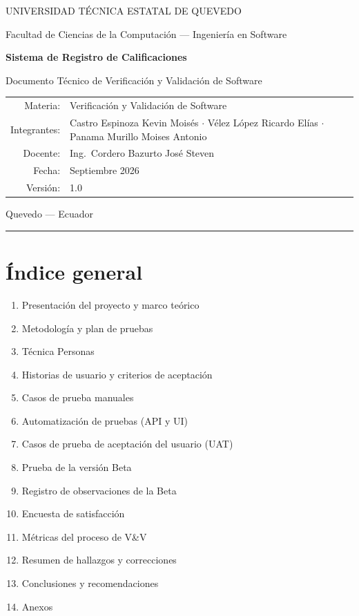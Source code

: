 \documentclass[11pt,a4paper]{article}
\begin{document}
\begin{titlepage}
\centering
{\Large UNIVERSIDAD T\'ECNICA ESTATAL DE QUEVEDO\par}
{\large Facultad de Ciencias de la Computaci\'on --- Ingenier\'ia en Software\par}
\vspace{1.5cm}
{\Large\bfseries Sistema de Registro de Calificaciones\par}
{\large Documento T\'ecnico de Verificaci\'on y Validaci\'on de Software\par}
\vspace{1.5cm}
\begin{tabular}{rl}
Materia: & Verificaci\'on y Validaci\'on de Software \\
Integrantes: & Castro Espinoza Kevin Mois\'es $\cdot$ V\'elez L\'opez Ricardo El\'ias $\cdot$ Panama Murillo Moises Antonio \\
Docente: & Ing.\ Cordero Bazurto Jos\'e Steven \\
Fecha: & Septiembre 2026 \\
Versi\'on: & 1.0 \\
\end{tabular}
\vfill
{\large Quevedo --- Ecuador\par}
\end{titlepage}
\tableofcontents
\newpage
{}


\hrule\vspace{0.4em}


\section*{Índice general}


\begin{enumerate}[leftmargin=*]
\item Presentación del proyecto y marco teórico
\item Metodología y plan de pruebas
\item Técnica Personas
\item Historias de usuario y criterios de aceptación
\item Casos de prueba manuales
\item Automatización de pruebas (API y UI)
\item Casos de prueba de aceptación del usuario (UAT)
\item Prueba de la versión Beta
\item Registro de observaciones de la Beta
\item Encuesta de satisfacción
\item Métricas del proceso de V\&V
\item Resumen de hallazgos y correcciones
\item Conclusiones y recomendaciones
\item Anexos
\end{enumerate}
\end{document}
